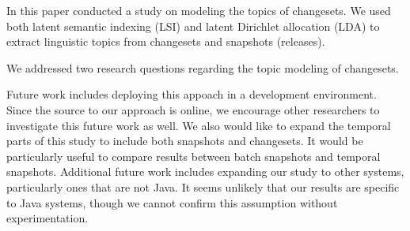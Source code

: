 
In this paper conducted a study on modeling the topics of changesets.
We used both latent semantic indexing (LSI) and latent Dirichlet
allocation (LDA) to extract linguistic topics from changesets and
snapshots (releases).

We addressed two research questions regarding the topic modeling of changesets.


Future work includes deploying this appoach in a development environment.
Since the source to our approach is online, we encourage other researchers
to investigate this future work as well.
We also would like to expand the temporal parts of this study to include
both snapshots and changesets.
It would be particularly useful to compare results between batch snapshots and temporal snapshots.
Additional future work includes expanding our study to other systems,
particularly ones that are not Java.
It seems unlikely that our results are specific to Java systems,
though we cannot confirm this assumption without experimentation.


